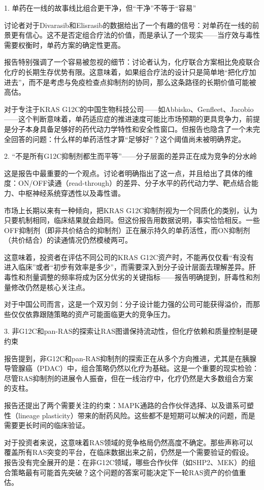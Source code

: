 \documentclass[11pt]{ctexart}
\begin{document}
1. 单药在一线的故事线比组合更干净，但“干净”不等于“容易”

讨论者对于Divarasib和Elisrasib的数据给出了一个有趣的信号：对单药在一线的前景更有信心。这不是否定组合疗法的价值，而是承认了一个现实——当疗效与毒性需要权衡时，单药方案的确定性更高。

报告特别强调了一个容易被忽视的细节：讨论者认为，化疗联合方案相比免疫联合化疗的长期生存优势有限。这意味着，如果组合疗法的设计只是简单地“把化疗加进去”，而不是考虑与免疫检查点抑制剂的协同，那么这条路径的长期价值可能被高估。

对于专注于KRAS G12C的中国生物科技公司——如Abbisko、Genfleet、Jacobio——这个判断意味着，单药适应症的推进速度可能比市场预期的更具竞争力，前提是分子本身具备足够好的药代动力学特性和安全性窗口。但报告也隐含了一个未完全回答的问题：什么样的单药活性才算“足够好”？这个阈值尚未被明确界定。

2. “不是所有G12C抑制剂都生而平等”——分子层面的差异正在成为竞争的分水岭

这是报告中最重要的一个观点。讨论者明确指出了这一点，并且给出了具体的维度：ON/OFF读通（read-through）的差异、分子水平的药代动力学、靶点结合能力、中枢神经系统穿透性以及毒性谱。

市场上长期以来有一种倾向，把KRAS G12C抑制剂视为一个同质化的类别，认为只要机制相同，临床结果就会趋同。但这份报告用数据说明，事实恰恰相反。一些OFF抑制剂（即非共价结合的抑制剂）正在展示持久的单药活性，而ON抑制剂（共价结合）的读通情况仍然模棱两可。

这意味着，投资者在评估不同公司的KRAS G12C资产时，不能再仅仅看“有没有进入临床”或者“初步有效率是多少”，而需要深入到分子设计层面去理解差异。肝毒性和剂量调整的频率将成为区分优劣的关键指标——报告明确提到，肝毒性和剂量修改仍然是核心关注点。

对于中国公司而言，这是一个双刃剑：分子设计能力强的公司可能获得溢价，而那些仅仅依靠跟随策略的资产可能面临更大的竞争压力。

3. 非G12C和pan-RAS的探索让RAS图谱保持流动性，但化疗依赖和质量控制是硬约束

报告提到，非G12C和pan-RAS抑制剂的探索正在从多个方向推进，尤其是在胰腺导管腺癌（PDAC）中，组合策略仍然以化疗为基础。这是一个重要的现实检验：尽管RAS抑制剂的进展令人振奋，但在一线治疗中，化疗仍然是大多数组合方案的支柱。

报告还提出了两个需要关注的约束：MAPK通路的合作伙伴选择、以及谱系可塑性（lineage plasticity）带来的耐药风险。这些都不是短期可以解决的问题，而是需要更长时间的临床验证。

对于投资者来说，这意味着RAS领域的竞争格局仍然高度不确定。那些声称可以覆盖所有RAS突变的平台，在临床数据出来之前，仍然是一个需要验证的假设。报告没有完全展开的是：在非G12C领域，哪些合作伙伴（如SHP2、MEK）的组合策略最有可能首先突破？这个问题的答案可能决定下一轮RAS资产的价值重估。
\end{document}
